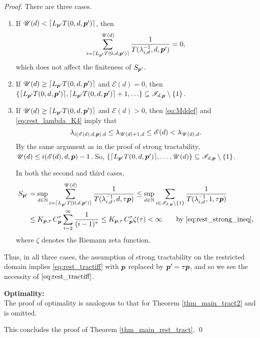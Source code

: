 \documentclass[sort&compress]{elsarticle}
\newcommand{\theM}{\mathscr{E}}
\newcommand{\theUB}{\mathscr{U}}
\begin{document}
\begin{proof}
There are three cases.
\begin{enumerate}
\renewcommand{\labelenumi}{\roman{enumi})}


\item If $\theUB(d) <\lceil L_{\vp'} T(0,d,\vp')\rceil$, then
\[
\sum_{i = \lceil L_{\vp'} T(0,d,\vp')\rceil }^{\theUB(d)} \frac{1}{T (\lambda_{i,d}^{-1},d, \vp')} = 0,
\]
which does not affect the finiteness of $S_{\boldsymbol{p}'}$.

\item If $\theUB(d) \ge \lceil L_{\vp'} T(0,d,\vp')\rceil$ and $\theM(d) = 0$, then $\{\lceil L_{\boldsymbol{p}'} T(0,d,\boldsymbol{p}')\rceil,  \lceil L_{\boldsymbol{p}'} T(0,d,\boldsymbol{p}')\rceil + 1, \ldots \} \subseteq \mathscr{I}_{d,\boldsymbol{p}} \setminus \{1\}$.

\item If $\theUB(d) \ge \lceil L_{\vp'} T(0,d,\vp')\rceil$ and $\theM(d) >0$, then \eqref{eq:Mddef} and \eqref{eq:rest_lambda_K4} imply that
\[
\lambda_{i(\theM(d),d,\vp),d} \le \lambda_{\theUB(d)+1,d} \le \theM(d) < \lambda_{\theUB(d),d}.
\]
By the same argument as in the proof of strong tractability, $\theUB(d) \le i(\theM(d),d,\vp)-1$.  So, $\{ \lceil L_{\vp'} T(0,d,\vp')\rceil, \ldots, \theUB(d)\} \subseteq \mathscr{I}_{d,\vp} \setminus \{1\}$.

\bigskip

In both the second and third cases,
\begin{align*}
S_{\vp'} & = \sup_{d\in\naturals} \sum_{i =  \lceil L_{\vp'} T(0,d,\vp')\rceil}^{\theUB(d)} \frac{1}{T (\lambda_{i,d}^{-1},d, \tau \vp)}
\le
\sup_{d\in\naturals} \sum_{i \in \mathscr{I}_{d,\vp} \setminus\{1\} } \frac{1}{T (\lambda_{i,d}^{-1},1, \tau \vp)} \\
&  \le  K_{\vp,\tau}\, C_{\vp}^\tau
\sum_{i=2}^\infty \frac{1}{(i-1)^\tau}
 \le K_{\vp,\tau}\, C_{\vp}^\tau
\zeta (\tau)
 < \infty \qquad \text{by \eqref{eq:rest_strong_ineq},}
\end{align*}
where $\zeta$ denotes the Riemann zeta function.

\end{enumerate}
Thus, in all three cases, the assumption of strong tractability on the restricted domain implies \eqref{eq:rest_tractiff} with $\boldsymbol{p}$ replaced by $\boldsymbol{p}' = \tau \boldsymbol{p}$, and so we see the necessity of $\eqref{eq:rest_tractiff}$.
\bigskip


\bigskip

\noindent \textbf{Optimality:} \\
The proof of optimality is analogous to that for Theorem \ref{thm_main_tract2} and is omitted.

\bigskip

\noindent
This concludes the proof of Theorem \ref{thm_main_rest_tract}.  \qed
\end{proof}
\end{document}
